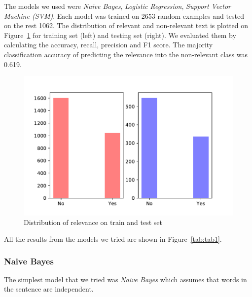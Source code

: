 \documentclass[11pt,a4paper]{article}
\begin{document}
The models we used were \textit{Naive Bayes}, \textit{Logistic Regression}, \textit{Support Vector Machine (SVM)}.
Each model was trained on 2653 random examples and tested on the rest 1062.
The distribution of relevant and non-relevant text is plotted on Figure~\ref{fig:fig1} for training set (left) and testing set (right).
We evaluated them by calculating the accuracy, recall, precision and F1 score.
The majority classification accuracy of predicting the relevance into the non-relevant class was 0.619.

\begin{figure}[h]
    \centering
    \includegraphics[width=1.1\columnwidth]{Figures/distribution.pdf}
    \caption{Distribution of relevance on train and test set}
    \label{fig:fig1}
\end{figure}

All the results from the models we tried are shown in Figure~\ref{tab:tab1}.

\subsubsection{Naive Bayes}
The simplest model that we tried was \textit{Naive Bayes} which assumes that words in the sentence are independent.

\end{document}
